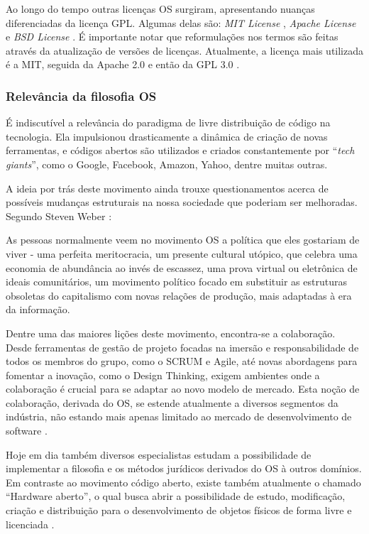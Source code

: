 \documentclass[12pt]{article}
\begin{document}
Ao longo do tempo outras licenças OS surgiram, apresentando nuanças diferenciadas da licença GPL. Algumas delas são: \textit{MIT License} \cite{mit_license}, \textit{Apache License} \cite{Apache_license} e \textit{BSD License} \cite{bsd_license}. É importante notar que reformulações nos termos são feitas através da atualização de versões de licenças. Atualmente, a licença mais utilizada é a MIT, seguida da Apache 2.0 e então da GPL 3.0 \cite{os_trend}.

\subsubsection{Relevância da filosofia OS}
É indiscutível a relevância do paradigma de livre distribuição de código na tecnologia. Ela impulsionou drasticamente a dinâmica de criação de novas ferramentas, e códigos abertos são utilizados e criados constantemente por ``\textit{tech giants}'', como o Google, Facebook, Amazon, Yahoo, dentre muitas outras.

A ideia por trás deste movimento ainda trouxe questionamentos acerca de possíveis mudanças estruturais na nossa sociedade que poderiam ser melhoradas. Segundo Steven Weber \cite{Weber2005}:

\begin{displayquote}
  As pessoas normalmente veem no movimento OS a política que eles gostariam de viver - uma perfeita meritocracia, um presente cultural utópico, que celebra uma economia de abundância ao invés de escassez, uma prova virtual ou eletrônica de ideais comunitários, um movimento político focado em substituir as estruturas obsoletas do capitalismo com novas relações de produção, mais adaptadas à era da informação.
\end{displayquote}

Dentre uma das maiores lições deste movimento, encontra-se a colaboração. Desde ferramentas de gestão de projeto focadas na imersão e responsabilidade de todos os membros do grupo, como o SCRUM e Agile, até novas abordagens para fomentar a inovação, como o Design Thinking, exigem ambientes onde a colaboração é crucial para se adaptar ao novo modelo de mercado. Esta noção de colaboração, derivada do OS, se estende atualmente a diversos segmentos da indústria, não estando mais apenas limitado ao mercado de desenvolvimento de software \cite{raconteur}.

Hoje em dia também diversos especialistas estudam a possibilidade de implementar a filosofia e os métodos jurídicos derivados do OS à outros domínios. Em contraste ao movimento código aberto, existe também atualmente o chamado ``Hardware aberto'', o qual busca abrir a possibilidade de estudo, modificação, criação e distribuição para o desenvolvimento de objetos físicos de forma livre e licenciada \cite{open_hardware}.
\end{document}
